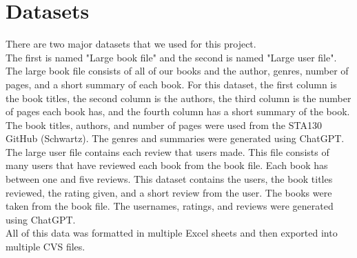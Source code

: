 \documentclass{article}
\begin{document}
\section{Datasets}
There are two major datasets that we used for this project. \\
\indent The first is named "Large book file" and the second is named "Large user file". The large book file consists of all of our books and the author, genres, number of pages, and a short summary of each book. For this dataset, the first column is the book titles, the second column is the authors, the third column is the number of pages each book has, and the fourth column has a short summary of the book. The book titles, authors, and number of pages were used from the STA130 GitHub (Schwartz). The genres and summaries were generated using ChatGPT. \\
\indent The large user file contains each review that users made. This file consists of many users that have reviewed each book from the book file. Each book has between one and five reviews. This dataset contains the users, the book titles reviewed, the rating given, and a short review from the user. The books were taken from the book file. The usernames, ratings, and reviews were generated using ChatGPT. \\
\indent All of this data was formatted in multiple Excel sheets and then exported into multiple CVS files. 
\end{document}
